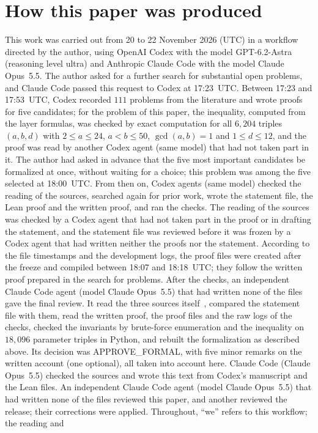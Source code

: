 \documentclass[11pt]{article}
\theoremstyle{definition}
\theoremstyle{remark}
\begin{document}
\section*{How this paper was produced}
This work was carried out from 20 to 22 November 2026 (UTC) in a workflow directed by
the author, using OpenAI Codex with the model GPT-6.2-Astra (reasoning level
ultra) and Anthropic Claude Code with the model Claude Opus~5.5. The author asked
for a further search for substantial open problems, and Claude
Code passed this request to Codex at 17:23~UTC. Between 17:23 and 17:53~UTC,
Codex recorded $111$ problems from the literature and wrote proofs for five
candidates; for the problem of this paper, the inequality, computed from the
layer formulas, was checked by exact computation for all $6{,}204$ triples $(a,b,d)$ with $2\le a\le24$, $a<b\le50$, $\gcd(a,b)=1$ and
$1\le d\le12$, and the proof was read by another Codex agent (same model) that had not
taken part in it. The author had asked in advance that the five most important
candidates be formalized at once, without waiting for a choice; this problem
was among the five selected at 18:00~UTC. From then on, Codex agents (same model)
checked the reading of the sources, searched again for prior work, wrote the
statement file, the Lean proof and the written proof, and ran the checks. The
reading of the sources was checked by a Codex agent that had not taken part in
the proof or in drafting the statement, and the statement file was reviewed
before it was frozen by a Codex agent that had written neither the proofs nor
the statement. According to the file timestamps and the development logs, the
proof files were created after the freeze and compiled between 18:07 and
18:18~UTC; they follow the written proof prepared in the search for problems.
After the checks, an independent Claude Code agent (model Claude Opus~5.5) that
had written none of the files gave the final review. It read the three sources
itself~\cite{cdffpu,cn,bcd}, compared the statement file with them, read the
written proof, the proof files and the raw logs of the checks, checked the
invariants by brute-force enumeration and the inequality on $18{,}096$ parameter
triples in Python, and rebuilt the formalization as described above. Its
decision was APPROVE\_FORMAL, with five minor remarks on the written account
(one optional), all taken into account here. Claude Code (Claude Opus~5.5)
checked the sources and wrote this text from Codex's manuscript and the Lean
files. An independent Claude Code agent (model Claude Opus~5.5) that had written none of the files reviewed this paper, and another reviewed the release; their corrections were applied. Throughout, ``we'' refers to this workflow; the reading and
\end{document}
